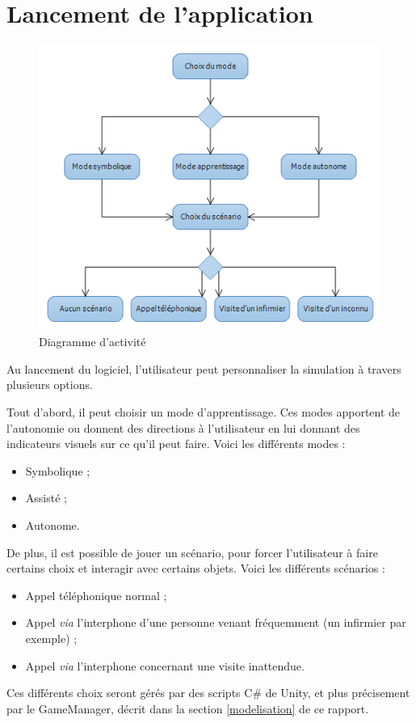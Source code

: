 \section{Lancement de l'application}

\begin{figure}[h]
\centering
\includegraphics[width=1\textwidth]{4-Conception/img/diagActivite.png}
\caption{ Diagramme d'activité}
\end{figure}

Au lancement du logiciel, l'utilisateur peut personnaliser la simulation à travers plusieurs options.

Tout d'abord, il peut choisir un mode d'apprentissage. Ces modes apportent de l'autonomie ou donnent des directions à l'utilisateur en lui donnant des indicateurs visuels sur ce qu'il peut faire. Voici les différents modes :
\begin{itemize}
\item Symbolique ;
\item Assisté ;
\item Autonome.
\end{itemize}

\vspace{\parskip}

De plus, il est possible de jouer un scénario, pour forcer l'utilisateur à faire certains choix et interagir avec certains objets. Voici les différents scénarios :
\begin{itemize}
\item Appel téléphonique normal ;
\item Appel \textit{via} l'interphone d'une personne venant fréquemment (un infirmier par exemple) ;
\item Appel \textit{via} l'interphone concernant une visite inattendue.
\end{itemize}

\vspace{\parskip}

Ces différents choix seront gérés par des scripts C\# de Unity, et plus précisement par le GameManager, décrit dans la section \ref{modelisation} de ce rapport.

